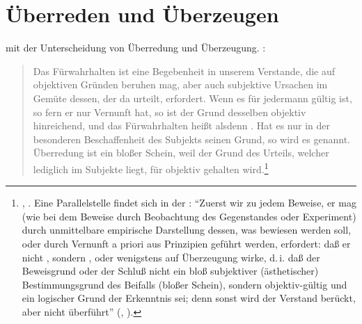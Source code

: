 \section{Überreden und
Überzeugen}\label{subsubsection:UEberredungundÜberzeugung}
 mit
der Unterscheidung von Überredung und Überzeugung. :
\begin{quote}
Das Fürwahrhalten ist eine Begebenheit in unserem Verstande, die auf objektiven
Gründen beruhen mag, aber auch subjektive Ursachen im Gemüte dessen, der da
urteilt, erfordert. Wenn es für jedermann gültig ist, so fern er nur Vernunft
hat, so ist der Grund desselben objektiv hinreichend, und das Fürwahrhalten
heißt alsdenn . Hat es nur in der besonderen Beschaffenheit des
Subjekts seinen Grund, so wird es  genannt.\\
Überredung ist ein bloßer Schein, weil der Grund des Urteils, welcher lediglich
im Subjekte liegt, für objektiv gehalten
wird.\footnote{\label{Anmerkung:KU90UeberredenUeberzeugen}\cite[][B
848]{Kant:KritikderreinenVernunft2003}, \cite[][III: 531.27--532.4]{Kant:GesammelteWerke1900ff.}. Eine Parallelstelle
findet sich in der : \enquote{Zuerst wir zu
jedem Beweise, er mag (wie bei dem Beweise durch Beobachtung des Gegenstandes
oder Experiment) durch unmittelbare empirische Darstellung dessen, was bewiesen
werden soll, oder durch Vernunft a priori aus Prinzipien geführt werden,
erfordert: daß er nicht , sondern , oder wenigstens
auf Überzeugung wirke, d.\,i. daß der Beweisgrund oder der Schluß nicht ein bloß
subjektiver (ästhetischer) Bestimmungsgrund des Beifalls (bloßer Schein),
sondern objektiv-gültig und ein logischer Grund der Erkenntnis sei; denn sonst
wird der Verstand berückt, aber nicht überführt}
\mkbibparens{\cite[][\S~90]{Kant:KritikderUrteilskraft2009}, \cite[][V:
461.14--22]{Kant:GesammelteWerke1900ff.}}.}
\end{quote}

